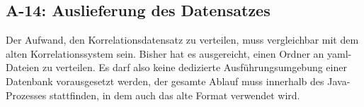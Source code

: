
\subsection{A-14: Auslieferung des Datensatzes}\label{subsec:req-correlation-data-delivery}

Der Aufwand, den Korrelationsdatensatz zu verteilen, muss vergleichbar mit dem alten Korrelationssystem sein.
Bisher hat es ausgereicht, einen Ordner an \acrshort{yaml}-Dateien zu verteilen.
Es darf also keine dedizierte Ausführungsumgebung einer Datenbank vorausgesetzt werden, der gesamte Ablauf muss innerhalb des Java-Prozesses stattfinden, in dem auch das alte Format verwendet wird.
